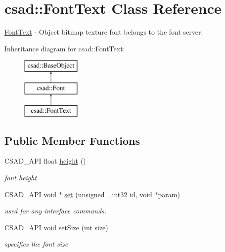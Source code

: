 \hypertarget{classcsad_1_1_font_text}{\section{csad\-:\-:Font\-Text Class Reference}
\label{classcsad_1_1_font_text}
}


\hyperlink{classcsad_1_1_font_text}{Font\-Text} -\/ Object bitmap texture font belongs to the font server.  


Inheritance diagram for csad\-:\-:Font\-Text\-:\begin{figure}[H]
\begin{center}
\leavevmode
\includegraphics[height=3.000000cm]{classcsad_1_1_font_text}
\end{center}
\end{figure}
\subsection*{Public Member Functions}
\begin{DoxyCompactItemize}
\item 
\hypertarget{classcsad_1_1_font_text_a3a350fe5f637472c95e4641a0940ddf3}{C\-S\-A\-D\-\_\-\-A\-P\-I float \hyperlink{classcsad_1_1_font_text_a3a350fe5f637472c95e4641a0940ddf3}{height} ()}\label{classcsad_1_1_font_text_a3a350fe5f637472c95e4641a0940ddf3}

\begin{DoxyCompactList}\small\item\em font height \end{DoxyCompactList}\item 
\hypertarget{classcsad_1_1_font_text_ac8558fa7d3c70e813d9a9b85a91ecc17}{C\-S\-A\-D\-\_\-\-A\-P\-I void $\ast$ \hyperlink{classcsad_1_1_font_text_ac8558fa7d3c70e813d9a9b85a91ecc17}{set} (unsigned \-\_\-int32 id, void $\ast$param)}\label{classcsad_1_1_font_text_ac8558fa7d3c70e813d9a9b85a91ecc17}

\begin{DoxyCompactList}\small\item\em used for any interface commands. \end{DoxyCompactList}\item 
\hypertarget{classcsad_1_1_font_text_a159e2ef03c6f8189be9b2723e561659c}{C\-S\-A\-D\-\_\-\-A\-P\-I void \hyperlink{classcsad_1_1_font_text_a159e2ef03c6f8189be9b2723e561659c}{set\-Size} (int size)}\label{classcsad_1_1_font_text_a159e2ef03c6f8189be9b2723e561659c}

\begin{DoxyCompactList}\small\item\em specifies the font size \end{DoxyCompactList}\end{DoxyCompactItemize}

